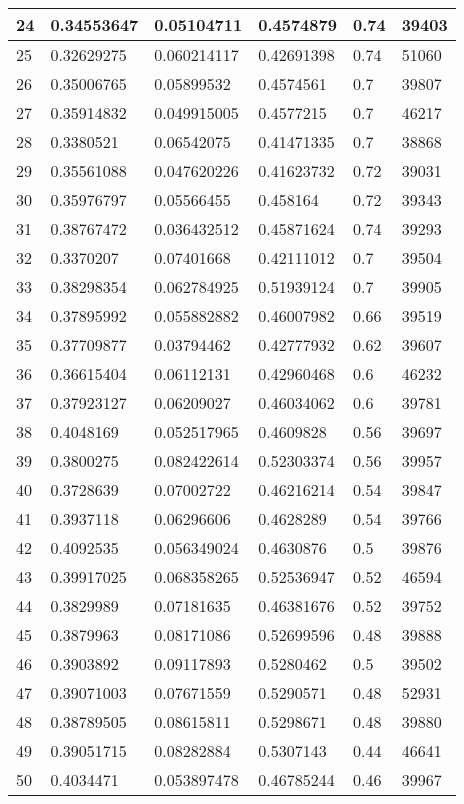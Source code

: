 \begin{longtable}{|l|l|l|l|l|l|}
24 & 0.34553647 & 0.05104711 & 0.4574879 & 0.74 & 39403 \\ \hline 
25 & 0.32629275 & 0.060214117 & 0.42691398 & 0.74 & 51060 \\ \hline 
26 & 0.35006765 & 0.05899532 & 0.4574561 & 0.7 & 39807 \\ \hline 
27 & 0.35914832 & 0.049915005 & 0.4577215 & 0.7 & 46217 \\ \hline 
28 & 0.3380521 & 0.06542075 & 0.41471335 & 0.7 & 38868 \\ \hline 
29 & 0.35561088 & 0.047620226 & 0.41623732 & 0.72 & 39031 \\ \hline 
30 & 0.35976797 & 0.05566455 & 0.458164 & 0.72 & 39343 \\ \hline 
31 & 0.38767472 & 0.036432512 & 0.45871624 & 0.74 & 39293 \\ \hline 
32 & 0.3370207 & 0.07401668 & 0.42111012 & 0.7 & 39504 \\ \hline 
33 & 0.38298354 & 0.062784925 & 0.51939124 & 0.7 & 39905 \\ \hline 
34 & 0.37895992 & 0.055882882 & 0.46007982 & 0.66 & 39519 \\ \hline 
35 & 0.37709877 & 0.03794462 & 0.42777932 & 0.62 & 39607 \\ \hline 
36 & 0.36615404 & 0.06112131 & 0.42960468 & 0.6 & 46232 \\ \hline 
37 & 0.37923127 & 0.06209027 & 0.46034062 & 0.6 & 39781 \\ \hline 
38 & 0.4048169 & 0.052517965 & 0.4609828 & 0.56 & 39697 \\ \hline 
39 & 0.3800275 & 0.082422614 & 0.52303374 & 0.56 & 39957 \\ \hline 
40 & 0.3728639 & 0.07002722 & 0.46216214 & 0.54 & 39847 \\ \hline 
41 & 0.3937118 & 0.06296606 & 0.4628289 & 0.54 & 39766 \\ \hline 
42 & 0.4092535 & 0.056349024 & 0.4630876 & 0.5 & 39876 \\ \hline 
43 & 0.39917025 & 0.068358265 & 0.52536947 & 0.52 & 46594 \\ \hline 
44 & 0.3829989 & 0.07181635 & 0.46381676 & 0.52 & 39752 \\ \hline 
45 & 0.3879963 & 0.08171086 & 0.52699596 & 0.48 & 39888 \\ \hline 
46 & 0.3903892 & 0.09117893 & 0.5280462 & 0.5 & 39502 \\ \hline 
47 & 0.39071003 & 0.07671559 & 0.5290571 & 0.48 & 52931 \\ \hline 
48 & 0.38789505 & 0.08615811 & 0.5298671 & 0.48 & 39880 \\ \hline 
49 & 0.39051715 & 0.08282884 & 0.5307143 & 0.44 & 46641 \\ \hline 
50 & 0.4034471 & 0.053897478 & 0.46785244 & 0.46 & 39967 \\ \hline 
\end{longtable}